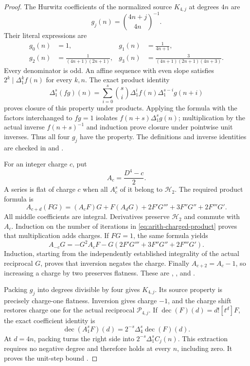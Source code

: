 \begin{proof}
The Hurwitz coefficients of the normalized source $K_{4,j}$ at degrees
$4n$ are
\[
 g_j(n)=\binom{4n+j}{4n}^{-1}.
\]
Their literal expressions are
\[
 \begin{aligned}
 g_0(n)&=1,&
 g_1(n)&=\frac1{4n+1},\\
 g_2(n)&=\frac1{(4n+1)(2n+1)},&
 g_3(n)&=\frac3{(4n+1)(2n+1)(4n+3)}.
 \end{aligned}
\]
Every denominator is odd.  An affine sequence with even slope satisfies
$2^k\mid\Delta_1^k f(n)$ for every $k,n$.  The exact product identity
\[
 \Delta_1^s(fg)(n)=\sum_{i=0}^s\binom si
          \Delta_1^if(n)\Delta_1^{s-i}g(n+i)
\]
proves closure of this property under products.  Applying the formula
with the factors interchanged to $fg=1$ isolates $f(n+s)\Delta_1^sg(n)$; multiplication by the actual inverse
$f(n+s)^{-1}$ and induction prove closure under pointwise unit inverses.
Thus all four $g_j$ have the property.  The definitions and inverse
identities are checked in
 and
.

For an integer charge $c$, put
\[
 A_c=\frac{D^4-c}{2}.
\]
A series is flat of charge $c$ when all $A_c^s$ of it belong to
$\mathcal H_2$.  The required product formula is
\begin{equation}\label{eq:arith-charged-product}
 A_{c+d}(FG)=(A_cF)G+F(A_dG)
       +2F'G'''+3F''G''+2F'''G'.
\end{equation}
All middle coefficients are integral.  Derivatives preserve
$\mathcal H_2$ and commute with $A_c$.  Induction on the number of
iterations in \eqref{eq:arith-charged-product} proves that multiplication
adds charges.  If $FG=1$, the same formula yields
\[
 A_{-c}G=-G^2A_cF-G(2F'G'''+3F''G''+2F'''G').
\]
Induction, starting from the independently established integrality of
the actual reciprocal $G$, proves that inversion negates the charge.
Finally $A_{c+2}=A_c-1$, so increasing a charge by two preserves flatness.
These are
,
, and
.

Packing $g_j$ into degrees divisible by four gives $K_{4,j}$.
Its source property is precisely charge-one flatness.  Inversion gives
charge $-1$, and the charge shift restores charge one for the actual
reciprocal $\mathcal P_{4,j}$.  If $\operatorname{dec}(F)(d)=d![t^d]F$, the exact
coefficient identity is
\[
 \operatorname{dec}(A_1^sF)(d)
       =2^{-s}\Delta_4^s\operatorname{dec}(F)(d).
\]
At $d=4n$, packing turns the right side into
$2^{-s}\Delta_1^sC_j(n)$.  This extraction requires no negative degree
and therefore holds at every $n$, including zero.  It proves the unit-step
bound .


\end{proof}
